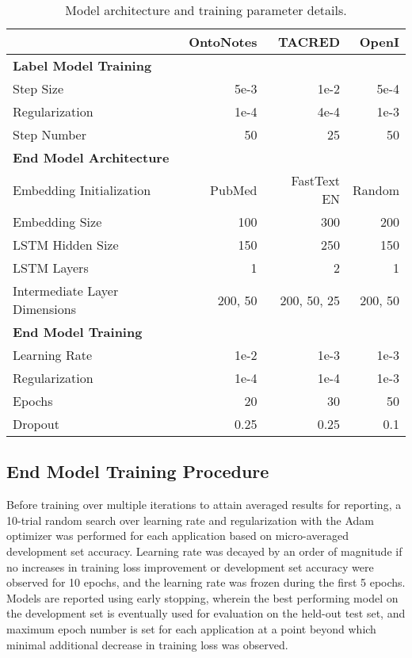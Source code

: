 \documentclass[letterpaper]{article}
\begin{document}
\begin{appendix}
\begin{table}[h!]
    \begin{center}
    \begin{tabular}{lrrr} 
        \toprule
        & OntoNotes & TACRED  & OpenI  \\ \midrule \midrule
        \textbf{Label Model Training} & & \\ \midrule
        Step Size & 5e-3 & 1e-2 & 5e-4 \\
          Regularization& 1e-4 &  4e-4 & 1e-3 \\
        Step Number &  50 & 25 & 50\\
        \midrule
        \textbf{End Model Architecture} & & \\ \midrule
        Embedding Initialization & PubMed & FastText EN & Random \\
        Embedding Size & 100 & 300 & 200\\
        LSTM Hidden Size & 150 & 250 & 150 \\
        LSTM Layers & 1 & 2 & 1 \\
        Intermediate Layer Dimensions & 200, 50 & 200, 50, 25  & 200, 50\\ \midrule
        \textbf{End Model Training} & & \\ \midrule
        Learning Rate & 1e-2 & 1e-3 & 1e-3 \\
         Regularization & 1e-4 & 1e-4  & 1e-3 \\
        Epochs & 20 & 30 & 50 \\
        Dropout & 0.25 & 0.25 & 0.1 \\ 
        \bottomrule
    \end{tabular}
    \caption{Model architecture and training parameter details.}
    \label{table:hyperparameters}
    \end{center}
    \end{table}

\subsection{End Model Training Procedure}
Before training over multiple iterations to attain averaged results for reporting, a 10-trial random search over learning rate and  regularization with the Adam optimizer was performed for each application based on micro-averaged development set accuracy.  Learning rate was decayed by an order of magnitude if no increases in training loss improvement or development set accuracy were observed for 10 epochs, and the learning rate was frozen during the first 5 epochs.  Models are reported using early stopping, wherein the best performing model on the development set is eventually used for evaluation on the held-out test set, and maximum epoch number is set for each application at a point beyond which minimal additional decrease in training loss was observed.


\end{appendix}
\end{document}
